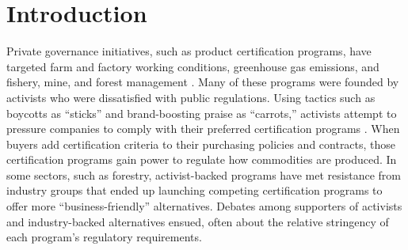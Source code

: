 \documentclass[
      12pt,
            Review ]{article}
\author{}
\date{\today}
\begin{document}
 














\noindent 
      \doublespacing 
    \section{Introduction}\label{introduction}

Private governance initiatives, such as product certification programs,
have targeted farm and factory working conditions, greenhouse gas
emissions, and fishery, mine, and forest management
\citep{Auld2014, Bartley2003, Bozzi2012, Hudson2003, VanderVen2015, Vince2017}.
Many of these programs were founded by activists who were dissatisfied
with public regulations. Using tactics such as boycotts as ``sticks''
and brand-boosting praise as ``carrots,'' activists attempt to pressure
companies to comply with their preferred certification programs
\citep{Cashore2002}. When buyers add certification criteria to their
purchasing policies and contracts, those certification programs gain
power to regulate how commodities are produced. In some sectors, such as
forestry, activist-backed programs have met resistance from industry
groups that ended up launching competing certification programs to offer
more ``business-friendly'' alternatives. Debates among supporters of
activists and industry-backed alternatives ensued, often about the
relative stringency of each program's regulatory requirements.
\end{document}
